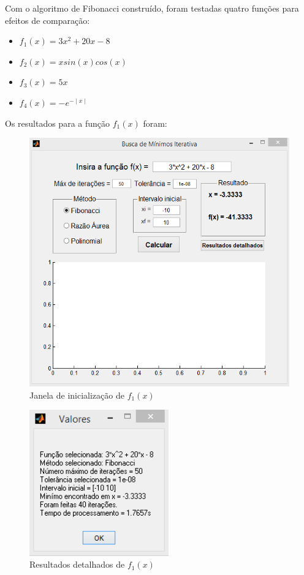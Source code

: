 Com o algoritmo de Fibonacci construído, foram testadas quatro funções para efeitos de comparação:

\begin{itemize}
	\item $ f_1(x) = 3x^2 + 20x - 8 $
	\item $ f_2(x) = xsin(x)cos(x) $
	\item $ f_3(x) = 5x $
	\item $ f_4(x) = -e^{-\mid x \mid} $
\end{itemize}

\newpage

Os resultados para a função $ f_1(x) $ foram:

\begin{figure}[h]
	\begin{center}
		\includegraphics[width=13cm]{../fibonacci/f1_gui.png}   
		\caption{Janela de inicialização de $ f_1(x) $}
		\label{fig:fibonacci-f1-gui}
	\end{center}
\end{figure}

\begin{figure}[h!]
	\begin{center}
		\includegraphics[width=6cm]{../fibonacci/f1_resultados.png}   
		\caption{Resultados detalhados de $ f_1(x) $}
		\label{fig:fibonacci-f1-resultados}
	\end{center}
\end{figure}

